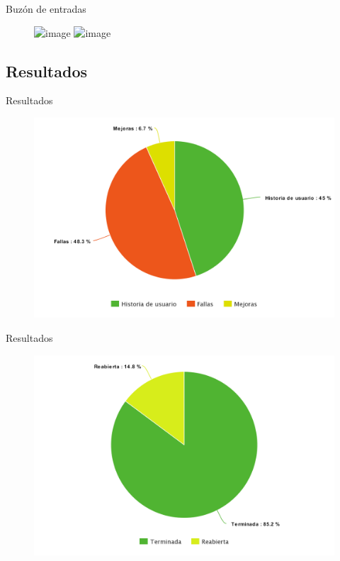 \documentclass[10pt,xcolor=table ]{beamer}
\begin{document}
\begin{frame}{Buzón de entradas}
	\begin{figure}
		\centering
		\includegraphics<1>[scale=0.3]{../Figuras/Pantallas/inbox}
		\includegraphics<2>[scale=0.3]{../Figuras/Pantallas/inbox_2}
	\end{figure}
\end{frame}

\subsection{Resultados}
\begin{frame}{Resultados}
	\begin{figure}
		\centering
	    \includegraphics[scale=0.235]{../Figuras/tickets_tipo}
	\end{figure}
\end{frame}

\begin{frame}{Resultados}
	\begin{figure}
		\centering
	    \includegraphics[scale=0.235]{../Figuras/historias_cerradas_reabiertas}
	\end{figure}
\end{frame}
\end{document}
